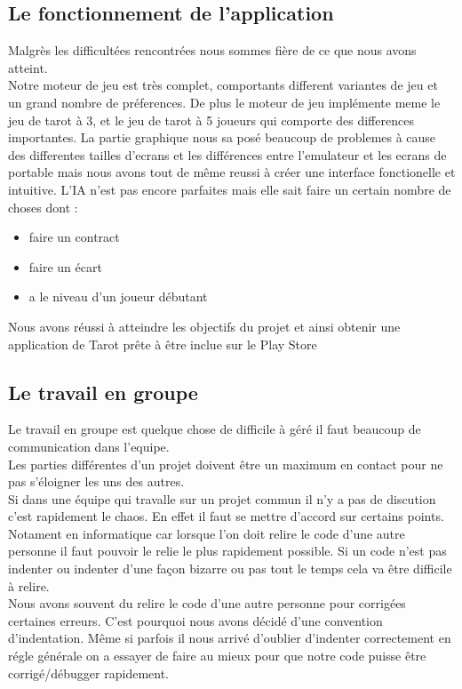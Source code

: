 \documentclass[a4paper]{report}
\begin{document}
		\subsection{Le fonctionnement de l'application}
			Malgrès les difficultées rencontrées nous sommes fière de ce que nous avons atteint.\\
			Notre moteur de jeu est très complet, comportants different variantes de jeu et un grand nombre de préferences. De plus le moteur de jeu implémente meme le jeu de tarot à 3, et le jeu de tarot à 5 joueurs qui comporte des differences importantes.
			La partie graphique nous sa posé beaucoup de problemes à cause des differentes tailles d'ecrans et les différences entre l'emulateur et les ecrans de portable mais nous avons tout de même reussi à créer une interface fonctionelle et intuitive.
			L'IA n'est pas encore parfaites mais elle sait faire un certain nombre de choses dont :
			\begin{itemize}
				\item faire un contract
				\item faire un écart
				\item a le niveau d'un joueur débutant 
	
			\end{itemize}
			Nous avons réussi à atteindre les objectifs du projet et ainsi obtenir une application de Tarot prête à être inclue sur le Play Store
			
	
		\subsection{Le travail en groupe }
		
			Le travail en groupe est quelque chose de difficile à géré il faut beaucoup de communication dans l’equipe.\\
			Les parties différentes d’un projet doivent être un maximum en contact pour ne pas s’éloigner les uns des autres.\\
			Si dans une équipe qui travalle sur un projet commun il n’y a pas de discution c’est rapidement le chaos. En effet il faut se mettre d’accord sur certains points. Notament en 				informatique car lorsque l’on doit relire le code d’une autre personne il faut pouvoir le relie le plus rapidement possible. Si un code n’est pas indenter ou indenter d’une 				façon bizarre ou pas tout le temps cela va être difficile à relire.\\
			Nous avons souvent du relire le code d’une autre personne pour corrigées certaines erreurs. C’est pourquoi nous avons décidé d’une convention d’indentation. Même si parfois il 			nous arrivé d’oublier d’indenter correctement en régle générale on a essayer de faire au mieux pour que notre code puisse être corrigé/débugger rapidement.\\
	
\end{document}
